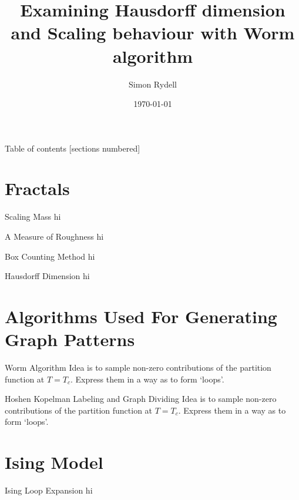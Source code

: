 \documentclass[10pt]{beamer}
\title{Examining Hausdorff dimension and Scaling behaviour with Worm algorithm}
\date{\today}
\date{}
\author{Simon Rydell}
\institute{Royal Institute of Technology, Stockholm}
\begin{document}
\maketitle

\begin{frame}{Table of contents}
  [sections numbered]
  \tableofcontents[hideallsubsections]
\end{frame}

\section{Fractals}

\begin{frame}{Scaling Mass}
    hi
\end{frame}

\begin{frame}{A Measure of Roughness}
    hi
\end{frame}

\begin{frame}{Box Counting Method}
    hi
\end{frame}

\begin{frame}{Hausdorff Dimension}
    hi
\end{frame}

\section{Algorithms Used For Generating Graph Patterns}

\begin{frame}{Worm Algorithm}
    Idea is to sample non-zero contributions of the partition function at $T = T_c$. Express them in a way as to form `loops'.
\end{frame}

\begin{frame}{Hoshen Kopelman Labeling and Graph Dividing}
    Idea is to sample non-zero contributions of the partition function at $T = T_c$. Express them in a way as to form `loops'.
\end{frame}

\section{Ising Model}

\begin{frame}{Ising Loop Expansion}
    hi
\end{frame}
\end{document}
